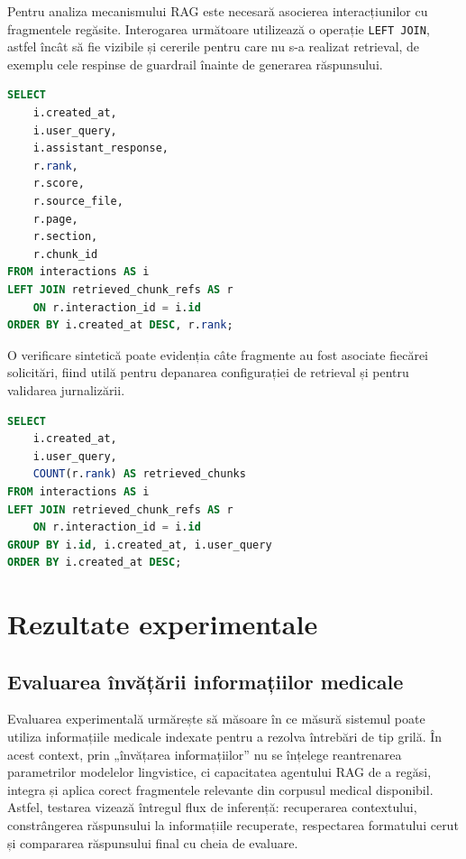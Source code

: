\documentclass[12pt, a4paper, oneside, romanian]{teza-upb}
\begin{document}
Pentru analiza mecanismului RAG este necesară asocierea interacțiunilor cu fragmentele regăsite. Interogarea următoare utilizează o operație \texttt{LEFT JOIN}, astfel încât să fie vizibile și cererile pentru care nu s-a realizat retrieval, de exemplu cele respinse de guardrail înainte de generarea răspunsului.

\begin{center}
\begin{minipage}{0.68\textwidth}
\begin{lstlisting}[language=SQL, caption={Asocierea răspunsurilor cu sursele recuperate}]
SELECT
    i.created_at,
    i.user_query,
    i.assistant_response,
    r.rank,
    r.score,
    r.source_file,
    r.page,
    r.section,
    r.chunk_id
FROM interactions AS i
LEFT JOIN retrieved_chunk_refs AS r
    ON r.interaction_id = i.id
ORDER BY i.created_at DESC, r.rank;
\end{lstlisting}
\end{minipage}
\end{center}

O verificare sintetică poate evidenția câte fragmente au fost asociate fiecărei solicitări, fiind utilă pentru depanarea configurației de retrieval și pentru validarea jurnalizării.

\begin{center}
\begin{minipage}{0.68\textwidth}
\begin{lstlisting}[language=SQL, caption={Numărul fragmentelor recuperate pentru fiecare interacțiune}]
SELECT
    i.created_at,
    i.user_query,
    COUNT(r.rank) AS retrieved_chunks
FROM interactions AS i
LEFT JOIN retrieved_chunk_refs AS r
    ON r.interaction_id = i.id
GROUP BY i.id, i.created_at, i.user_query
ORDER BY i.created_at DESC;
\end{lstlisting}
\end{minipage}
\end{center}


\chapter{Rezultate experimentale}

\section{Evaluarea învățării informațiilor medicale}

Evaluarea experimentală urmărește să măsoare în ce măsură sistemul poate utiliza informațiile medicale indexate pentru a rezolva întrebări de tip grilă. În acest context, prin „învățarea informațiilor” nu se înțelege reantrenarea parametrilor modelelor lingvistice, ci capacitatea agentului RAG de a regăsi, integra și aplica corect fragmentele relevante din corpusul medical disponibil. Astfel, testarea vizează întregul flux de inferență: recuperarea contextului, constrângerea răspunsului la informațiile recuperate, respectarea formatului cerut și compararea răspunsului final cu cheia de evaluare.
\end{document}
